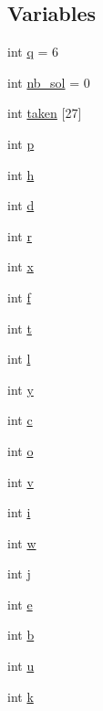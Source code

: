 \subsection*{Variables}
\begin{DoxyCompactItemize}
\item 
int \mbox{\hyperlink{alphabet_8_c_a39ed6f33ae9187d166e4d9d69e456ff9}{q}} = 6
\item 
int \mbox{\hyperlink{alphabet_8_c_a8059a1d2e4c33dbffdc8c7cd659a3e4d}{nb\+\_\+sol}} = 0
\item 
int \mbox{\hyperlink{alphabet_8_c_a9aed94c6128317cc3c8c3c51c7b248c8}{taken}} \mbox{[}27\mbox{]}
\item 
int \mbox{\hyperlink{alphabet_8_c_a533391314665d6bf1b5575e9a9cd8552}{p}}
\item 
int \mbox{\hyperlink{alphabet_8_c_a16611451551e3d15916bae723c3f59f7}{h}}
\item 
int \mbox{\hyperlink{alphabet_8_c_a6f364afbe132c4ecfea48bde1b0618ba}{d}}
\item 
int \mbox{\hyperlink{alphabet_8_c_acab531abaa74a7e664e3986f2522b33a}{r}}
\item 
int \mbox{\hyperlink{alphabet_8_c_a6150e0515f7202e2fb518f7206ed97dc}{x}}
\item 
int \mbox{\hyperlink{alphabet_8_c_a362077c979b0bb65159c603270e40f70}{f}}
\item 
int \mbox{\hyperlink{alphabet_8_c_ac310d9181e916ba43604099aee272c71}{t}}
\item 
int \mbox{\hyperlink{alphabet_8_c_a89606eca6b563ec68d2da2e84657736f}{l}}
\item 
int \mbox{\hyperlink{alphabet_8_c_a0a2f84ed7838f07779ae24c5a9086d33}{y}}
\item 
int \mbox{\hyperlink{alphabet_8_c_a4e1e0e72dd773439e333c84dd762a9c3}{c}}
\item 
int \mbox{\hyperlink{alphabet_8_c_a8198753dd743101d6583a27b1454fc4a}{o}}
\item 
int \mbox{\hyperlink{alphabet_8_c_ac8859e8c1ce357c4c8b37bbb1936ba1c}{v}}
\item 
int \mbox{\hyperlink{alphabet_8_c_acb559820d9ca11295b4500f179ef6392}{i}}
\item 
int \mbox{\hyperlink{alphabet_8_c_aac374e320caaadeca4874add33b62af2}{w}}
\item 
int \mbox{\hyperlink{alphabet_8_c_a37d972ae0b47b9099e30983131d31916}{j}}
\item 
int \mbox{\hyperlink{alphabet_8_c_a88859ce72faebb79ea0a2bca00a0f46b}{e}}
\item 
int \mbox{\hyperlink{alphabet_8_c_a148e3876077787926724625411d6e7a9}{b}}
\item 
int \mbox{\hyperlink{alphabet_8_c_a5874b4c2ec2e28321eea4e4871d08222}{u}}
\item 
int \mbox{\hyperlink{alphabet_8_c_ab66ed8e0098c0a86b458672a55a9cca9}{k}}
\end{DoxyCompactItemize}


